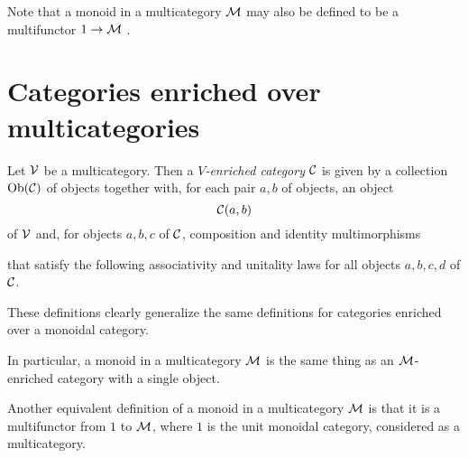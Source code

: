 \documentclass{report}[11pt]
\begin{document}
Note that a monoid in a multicategory $\mathcal M$ may also be defined to be a multifunctor $1 \to \mathcal M$ \cite[2.1.11]{Multicategories}.

\section{Categories enriched over multicategories}

\begin{definition}
  \label{DefEnrichedCategoryMulticategory}
  Let ${\mathcal{V}}$ be a multicategory.  
  Then a \emph{$V$-enriched category} ${\mathcal{C}}$ is given by a collection $\text{Ob}({\mathcal{C}})$ of objects together with, for each pair $a,b$ of objects, an object
  \[
    {\mathcal{C}}(a,b)
    \]
  of ${\mathcal{V}}$ and, for objects $a,b,c$ of ${\mathcal{C}}$, composition and identity multimorphisms
  that satisfy the following associativity and unitality laws for all objects $a,b,c,d$ of ${\mathcal{C}}$.
\end{definition}

\begin{remark}
  These definitions clearly generalize the same definitions for categories enriched over a monoidal category.

  In particular, a monoid in a multicategory $\mathcal M$ is the same thing as an $\mathcal M$-enriched category with a single object.

  Another equivalent definition of a monoid in a multicategory $\mathcal M$ is that it is a multifunctor from $1$ to $\mathcal M$, where $1$ is the unit monoidal category, considered as a multicategory.
\end{remark}
\end{document}
